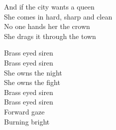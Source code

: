 \begin{lyrics}
And if the city wants a queen\\
She comes in hard, sharp and clean\\
No one hands her the crown\\
She drags it through the town

Brass eyed siren\\
Brass eyed siren\\
She owns the night\\
She owns the fight\\
Brass eyed siren\\
Brass eyed siren\\
Forward gaze\\
Burning bright
\end{lyrics}
